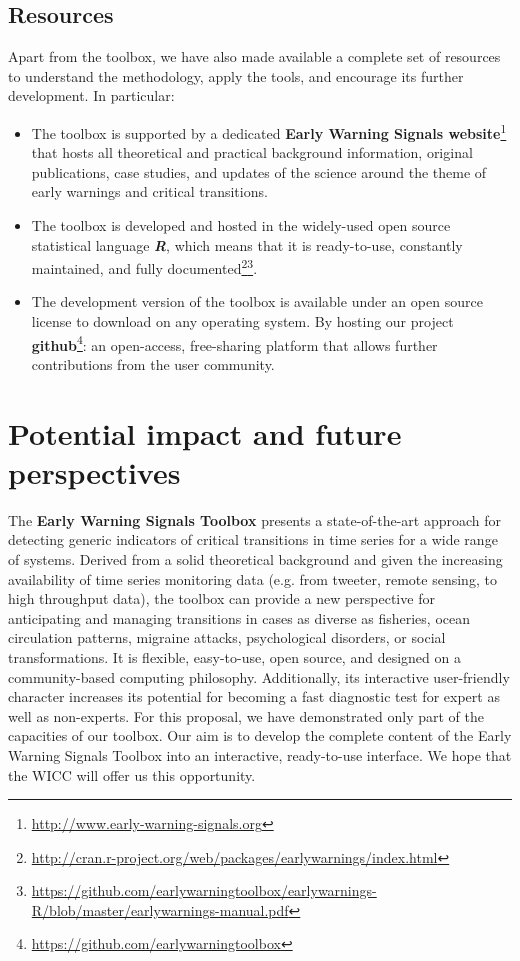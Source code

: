 \documentclass[12pt,a4paper,final]{article}
\begin{document}
\subsection{Resources} 

\label{sec:resources}
Apart from the toolbox, we have also made available a complete set of resources to understand the methodology, apply the tools, and encourage its further development. In particular:
\begin{itemize}
\item The toolbox is supported by a dedicated \textbf{Early Warning Signals website}\footnote{\url{http://www.early-warning-signals.org}} that hosts all theoretical and practical background information, original publications, case studies, and updates of the science around the theme of early warnings and critical transitions. 
\item The toolbox is developed and hosted in the widely-used open source statistical language \textbf{\textit{R}}, which means that it is ready-to-use, constantly maintained, and fully documented\footnote{\url{http://cran.r-project.org/web/packages/earlywarnings/index.html}}\footnote{\url{https://github.com/earlywarningtoolbox/earlywarnings-R/blob/master/earlywarnings-manual.pdf}}.
 \item The development version of the toolbox is available under an open source license to download on any operating system. By hosting our project \textbf{github}\footnote{\url{https://github.com/earlywarningtoolbox}}: an open-access, free-sharing platform that allows further contributions from the user community.
 \end{itemize}


\section{Potential impact and future perspectives}
The \textbf{Early Warning Signals Toolbox} presents a state-of-the-art approach for detecting generic indicators of critical transitions in time series for a wide range of systems. Derived from a solid theoretical background and given the increasing availability of time series monitoring data (e.g. from tweeter, remote sensing, to high throughput data), the toolbox can provide a new perspective for anticipating and managing transitions in cases as diverse as fisheries, ocean circulation patterns, migraine attacks, psychological disorders, or social transformations. It is flexible, easy-to-use, open source, and designed on a community-based computing philosophy. Additionally, its interactive user-friendly character increases its potential for becoming a fast diagnostic test for expert as well as non-experts. For this proposal, we have demonstrated only part of the capacities of our toolbox. Our aim is to develop the complete content of the Early Warning Signals Toolbox into an interactive, ready-to-use interface. We hope that the WICC will offer us this opportunity.
\end{document}
